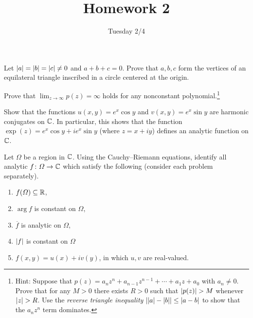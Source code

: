 \documentclass{../math135}
\title{Homework 2}
\author{}
\date{Tuesday 2/4}
\begin{document}
\begin{exercise}
	Let \(\abs a = \abs b = \abs c \ne 0\) and \(a + b + c = 0\).  Prove
  that \(a, b, c\) form the vertices of an equilateral triangle
  inscribed in a circle centered at the origin.
\end{exercise}

\begin{exercise}
	Prove that \(\lim_{z\to \infty} p(z) = \infty\) holds for any
  nonconstant polynomial.\footnote{Hint: Suppose that
    \(p(z) = a_n z^n + a_{n-1} z^{n-1} + \cdots + a_1 z + a_0\) with
    \(a_n \ne 0\).  Prove that for any \(M >0\) there exists \(R>0\)
    such that \(\abs{p(z)} > M\) whenever \(\abs z > R\).  Use the
    \emph{reverse triangle inequality}
    \(\abs*{\abs a - \abs b} \le \abs{a-b}\) to show that the
    \(a_n z^n\) term dominates.}
\end{exercise}

\begin{exercise}
	Show that the functions \(u(x, y) = e^x \cos y\) and
  \(v(x, y) = e^x \sin y\) are harmonic conjugates on \(\CC\).  In
  particular, this shows that the function
  \(\exp(z) = e^x\cos y + i e^x \sin y\) (where \(z=x+iy\)) defines an
  analytic function on \(\CC\).
\end{exercise}

\begin{exercise}
	Let \(\Omega\) be a region in \(\CC\).  Using the Cauchy--Riemann
  equations, identify all analytic \(f \colon \Omega\to\CC\) which satisfy
  the following (consider each problem separately).
	\begin{enumerate}
  \item \(f(\Omega) \subseteq \RR\),

  \item \(\arg f\) is constant on \(\Omega\),

  \item \(\overline{f}\) is analytic on \(\Omega\),

  \item \(\abs f\) is constant on \(\Omega\)

  \item \(f(x,y) = u(x) + i v(y)\), in which \(u,v\) are real-valued.

	\end{enumerate}
\end{exercise}
\end{document}
